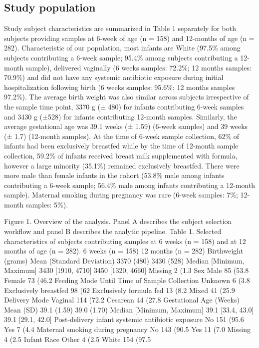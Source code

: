 \subsection{Study population}
Study subject characteristics are summarized in Table 1 separately for both subjects providing samples at 6-week of age (n = 158) and 12-months of age (n = 282). Characteristic of our population, most infants are White (97.5\% among subjects contributing a 6-week sample; 95.4\% among subjects contributing a 12-month sample), delivered vaginally (6 weeks samples: 72.2\%; 12 months samples: 70.9\%) and did not have any systemic antibiotic exposure during initial hospitalization following birth (6 weeks samples: 95.6\%; 12 months samples 97.2\%). The average birth weight was also similar across subjects irrespective of the sample time point, 3370 g (± 480) for infants contributing 6-week samples and 3430 g (±528) for infants contributing 12-month samples. Similarly, the average gestational age was 39.1 weeks (± 1.59) (6-week samples) and 39 weeks (± 1.7) (12-month samples). At the time of 6-week sample collection, 62\% of infants had been exclusively breastfed while by the time of 12-month sample collection, 59.2\% of infants received breast milk supplemented with formula, however a large minority (35.1\%) remained exclusively breastfed. There were more male than female infants in the cohort (53.8\% male among infants contributing a 6-week sample; 56.4\% male among infants contributing a 12-month sample). Maternal smoking during pregnancy was rare (6-week samples: 7\%; 12-month samples: 5\%). 
 
Figure 1. Overview of the analysis. Panel A describes the subject selection workflow and panel B describes the analytic pipeline. 
Table 1. Selected characteristics of subjects contributing samples at 6 weeks (n = 158) and at 12 months of age (n = 282).
	6 weeks
(n = 158)	12 months
(n = 282)
Birthweight (grams)		
Mean (Standard Deviation)	3370 (480)	3430 (528)
Median [Minimum, Maximum]	3430 [1910, 4710]	3450 [1320, 4660]
Missing	2 (1.3%
Sex		
Male	85 (53.8%
Female	73 (46.2%
Feeding Mode Until Time of Sample Collection		
Unknown	6 (3.8%
Exclusively breastfed	98 (62%
Exclusively formula fed	13 (8.2%
Mixed	41 (25.9%
Delivery Mode		
Vaginal	114 (72.2%
Cesarean	44 (27.8%
Gestational Age (Weeks)		
Mean (SD)	39.1 (1.59)	39.0 (1.70)
Median [Minimum, Maximum]	39.1 [33.4, 43.0]	39.1 [29.1, 42.0]
Post-delivery infant systemic antibiotic exposure		
No	151 (95.6%
Yes	7 (4.4%
Maternal smoking during pregnancy		
No	143 (90.5%
Yes	11 (7.0%
Missing	4 (2.5%
Infant Race		
Other	4 (2.5%
White	154 (97.5%

